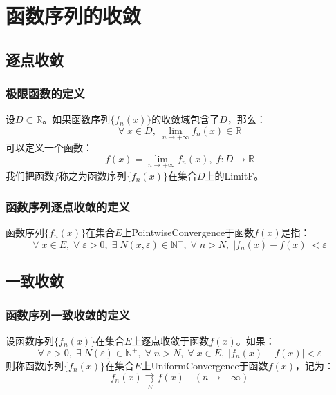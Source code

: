\section{函数序列的收敛}

\subsection{逐点收敛}
\subsubsection{极限函数的定义}
\begin{definition}
	设$D\subset\mathbb{R}$。如果函数序列$\{f_n(x)\}$的收敛域包含了$D$，那么：
	\begin{equation*}
		\forall\;x\in D,\;\lim_{n\to+\infty}f_n(x)\in\mathbb{R}
	\end{equation*}
	可以定义一个函数：
	\begin{equation*}
		f(x)=\lim_{n\to+\infty}f_n(x),\;f:D\rightarrow\mathbb{R}
	\end{equation*}
	我们把函数$f$称之为函数序列$\{f_n(x)\}$在集合$D$上的\gls{LimitF}。
\end{definition}
\subsubsection{函数序列逐点收敛的定义}
\begin{definition}
	函数序列$\{f_n(x)\}$在集合$E$上\gls{PointwiseConvergence}于函数$f(x)$是指：
	\begin{equation*}
		\forall\;x\in E,\;\forall\;\varepsilon>0,\;\exists\; N(x,\varepsilon)\in\mathbb{N}^+,\;\forall\;n>N,\;|f_n(x)-f(x)|<\varepsilon
	\end{equation*}
\end{definition}

\subsection{一致收敛}
\subsubsection{函数序列一致收敛的定义}
\begin{definition}
	设函数序列$\{f_n(x)\}$在集合$E$上逐点收敛于函数$f(x)$。如果：
	\begin{equation*}
		\forall\;\varepsilon>0,\;\exists\; N(\varepsilon)\in\mathbb{N}^+,\;\forall\;n>N,\;\forall\;x\in E,\;|f_n(x)-f(x)|<\varepsilon
	\end{equation*}
	则称函数序列$\{f_n(x)\}$在集合$E$上\gls{UniformConvergence}于函数$f(x)$，记为：
	\begin{equation*}
		f_n(x)\underset{E}{\rightrightarrows}f(x)\quad(n\to+\infty)
	\end{equation*}
\end{definition}
